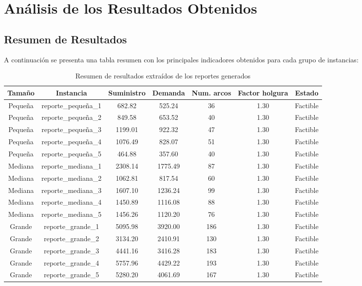 \documentclass[a4paper,12pt]{article}
\begin{document}
\section{Análisis de los Resultados Obtenidos}
\subsection{Resumen de Resultados}
A continuación se presenta una tabla resumen con los principales indicadores obtenidos para cada grupo de instancias:

\begin{table}[H]
\centering
\begin{tabular}{|c|c|c|c|c|c|c|}
\hline
\textbf{Tamaño} & \textbf{Instancia} & \textbf{Suministro} & \textbf{Demanda} & \textbf{Num. arcos} & \textbf{Factor holgura} & \textbf{Estado} \\
\hline
Pequeña & reporte\_pequeña\_1 & 682.82 & 525.24 & 36 & 1.30 & Factible \\
Pequeña & reporte\_pequeña\_2 & 849.58 & 653.52 & 40 & 1.30 & Factible \\
Pequeña & reporte\_pequeña\_3 & 1199.01 & 922.32 & 47 & 1.30 & Factible \\
Pequeña & reporte\_pequeña\_4 & 1076.49 & 828.07 & 51 & 1.30 & Factible \\
Pequeña & reporte\_pequeña\_5 & 464.88 & 357.60 & 40 & 1.30 & Factible \\
Mediana & reporte\_mediana\_1 & 2308.14 & 1775.49 & 87 & 1.30 & Factible \\
Mediana & reporte\_mediana\_2 & 1062.81 & 817.54 & 60 & 1.30 & Factible \\
Mediana & reporte\_mediana\_3 & 1607.10 & 1236.24 & 99 & 1.30 & Factible \\
Mediana & reporte\_mediana\_4 & 1450.89 & 1116.08 & 88 & 1.30 & Factible \\
Mediana & reporte\_mediana\_5 & 1456.26 & 1120.20 & 76 & 1.30 & Factible \\
Grande & reporte\_grande\_1 & 5095.98 & 3920.00 & 186 & 1.30 & Factible \\
Grande & reporte\_grande\_2 & 3134.20 & 2410.91 & 130 & 1.30 & Factible \\
Grande & reporte\_grande\_3 & 4441.16 & 3416.28 & 183 & 1.30 & Factible \\
Grande & reporte\_grande\_4 & 5757.96 & 4429.22 & 193 & 1.30 & Factible \\
Grande & reporte\_grande\_5 & 5280.20 & 4061.69 & 167 & 1.30 & Factible \\
\hline
\end{tabular}
\caption{Resumen de resultados extraídos de los reportes generados}
\end{table}
\end{document}
